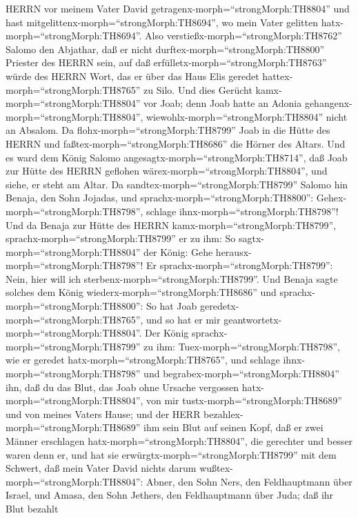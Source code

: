 HERRN vor meinem Vater David getragenx-morph=``strongMorph:TH8804'' und
hast mitgelittenx-morph=``strongMorph:TH8694'', wo mein Vater gelitten
hatx-morph=``strongMorph:TH8694''.  Also
verstießx-morph=``strongMorph:TH8762'' Salomo den Abjathar, daß er nicht
durftex-morph=``strongMorph:TH8800'' Priester des HERRN sein, auf daß
erfülletx-morph=``strongMorph:TH8763'' würde des HERRN Wort, das er über
das Haus Elis geredet hattex-morph=``strongMorph:TH8765'' zu Silo.
 Und dies Gerücht kamx-morph=``strongMorph:TH8804'' vor
Joab; denn Joab hatte an Adonia gehangenx-morph=``strongMorph:TH8804'',
wiewohlx-morph=``strongMorph:TH8804'' nicht an Absalom. Da
flohx-morph=``strongMorph:TH8799'' Joab in die Hütte des HERRN und
faßtex-morph=``strongMorph:TH8686'' die Hörner des Altars. 
Und es ward dem König Salomo angesagtx-morph=``strongMorph:TH8714'', daß
Joab zur Hütte des HERRN geflohen wärex-morph=``strongMorph:TH8804'',
und siehe, er steht am Altar. Da sandtex-morph=``strongMorph:TH8799''
Salomo hin Benaja, den Sohn Jojadas, und
sprachx-morph=``strongMorph:TH8800'':
Gehex-morph=``strongMorph:TH8798'', schlage
ihnx-morph=``strongMorph:TH8798''!  Und da Benaja zur Hütte
des HERRN kamx-morph=``strongMorph:TH8799'',
sprachx-morph=``strongMorph:TH8799'' er zu ihm: So
sagtx-morph=``strongMorph:TH8804'' der König: Gehe
herausx-morph=``strongMorph:TH8798''! Er
sprachx-morph=``strongMorph:TH8799'': Nein, hier will ich
sterbenx-morph=``strongMorph:TH8799''. Und Benaja sagte solches dem
König wiederx-morph=``strongMorph:TH8686'' und
sprachx-morph=``strongMorph:TH8800'': So hat Joab
geredetx-morph=``strongMorph:TH8765'', und so hat er mir
geantwortetx-morph=``strongMorph:TH8804''.  Der König
sprachx-morph=``strongMorph:TH8799'' zu ihm:
Tuex-morph=``strongMorph:TH8798'', wie er geredet
hatx-morph=``strongMorph:TH8765'', und schlage
ihnx-morph=``strongMorph:TH8798'' und
begrabex-morph=``strongMorph:TH8804'' ihn, daß du das Blut, das Joab
ohne Ursache vergossen hatx-morph=``strongMorph:TH8804'', von mir
tustx-morph=``strongMorph:TH8689'' und von meines Vaters Hause;
 und der HERR bezahlex-morph=``strongMorph:TH8689'' ihm
sein Blut auf seinen Kopf, daß er zwei Männer erschlagen
hatx-morph=``strongMorph:TH8804'', die gerechter und besser waren denn
er, und hat sie erwürgtx-morph=``strongMorph:TH8799'' mit dem Schwert,
daß mein Vater David nichts darum wußtex-morph=``strongMorph:TH8804'':
Abner, den Sohn Ners, den Feldhauptmann über Israel, und Amasa, den Sohn
Jethers, den Feldhauptmann über Juda;  daß ihr Blut bezahlt
